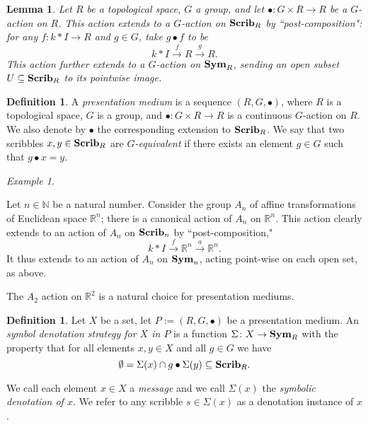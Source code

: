 \documentclass{amsart}
\def\to{\rightarrow}
\def\To{\xrightarrow}
\def\RR{{\mathbb R}}
\def\ss{\subseteq}
\def\taking{\colon}
\def\To{\xrightarrow}
\def\cross{\times}
\def\Scrib{{\bf Scrib}}
\def\Sym{{\bf Sym}}
\def\NN{\mathbb N}
\newtheorem{lemma}[theorem]{Lemma}
\theoremstyle{remark}
\newtheorem{example}[theorem]{Example}
\theoremstyle{definition}
\newtheorem{definition}[theorem]{Definition}
\begin{document}
\begin{lemma}

Let $R$ be a topological space, $G$ a group, and let $\bullet\taking G\cross R\to R$ be a $G$-action on $R$. This action extends to a $G$-action on $\Scrib_R$ by ``post-composition": for any $f\taking k*I\to R$ and $g\in G$, take $g\bullet f$ to be $$k*I\To{f}R\To{g}R.$$ This action further extends to a $G$-action on $\Sym_R$, sending an open subset $U\ss\Scrib_R$ to its pointwise image.

\end{lemma}

\begin{definition}

A {\em presentation medium} is a sequence $(R,G,\bullet)$, where $R$ is a topological space, $G$ is a group, and $\bullet\taking G\cross R\to R$ is a continuous $G$-action on $R$. We also denote by $\bullet$ the corresponding extension to $\Scrib_R$. We say that two scribbles $x,y\in\Scrib_R$ are {\em $G$-equivalent} if there exists an element $g\in G$ such that $g\bullet x=y.$

\end{definition}

\begin{example}\label{ex:reals}

Let $n\in\NN$ be a natural number. Consider the group $A_n$ of affine transformations of Euclidean space $\RR^n$; there is a canonical action of $A_n$ on $\RR^n$. This action clearly extends to an action of $A_n$ on $\Scrib_n$ by ``post-composition," $$k*I\To{f}\RR^n\To{a}\RR^n.$$ It thus extends to an action of $A_n$ on $\Sym_n$, acting point-wise on each open set, as above.

The $A_2$ action on $\RR^2$ is a natural choice for presentation mediums.

\end{example}

\begin{definition}

Let $X$ be a set, let $P:=(R,G,\bullet)$ be a presentation medium. An {\em symbol denotation strategy for $X$ in $P$} is a function $\Sigma\taking X\to\Sym_R$ with the property that for all elements $x,y\in X$ and all $g\in G$ we have $$\emptyset=\Sigma(x)\cap g\bullet \Sigma(y) \ss\Scrib_R.$$ 

We call each element $x\in X$ a {\em message} and we call $\Sigma(x)$ the {\em symbolic denotation of $x$}. We refer to any scribble $s\in\Sigma(x)$ as a denotation instance of $x$.

\end{definition}
\end{document}
